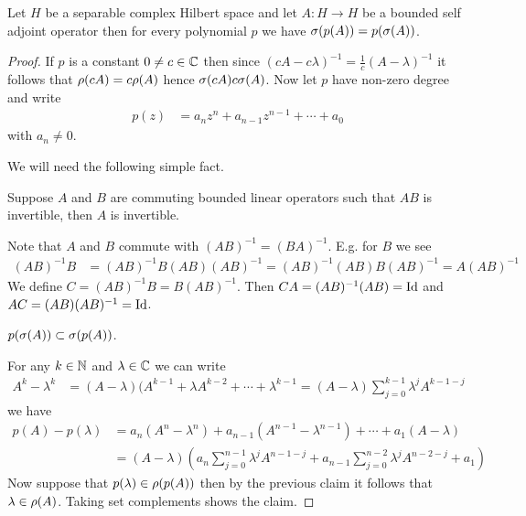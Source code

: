 \begin{lem}\label{hilbert:SpectralMappingPolynomialBoundedSelfAdjoint}Let $H$ be a separable complex Hilbert space and let $A :H \to H$ be a bounded self adjoint operator then for every polynomial $p$ we have $\sigma(p(A)) = p(\sigma(A))$.
\end{lem}
\begin{proof}
If $p$ is a constant $0 \neq c \in \mathbb{C}$ then since $(c A - c \lambda)^{-1}  = \frac{1}{c} (A - \lambda)^{-1}$ it follows that $\rho(cA) = c \rho(A)$ hence $\sigma(cA) c\sigma(A)$.  Now let $p$ have non-zero degree and write 
\begin{align*}
p(z) &= a_n z^n + a_{n-1} z^{n-1} + \dotsb + a_0
\end{align*}
with $a_n \neq 0$.  

We will need the following simple fact.
\begin{clm}Suppose $A$ and $B$ are commuting bounded linear operators such that $AB$ is invertible, then $A$ is invertible.
\end{clm}
Note that $A$ and $B$ commute with $(AB)^{-1} = (BA)^{-1}$.  E.g. for $B$ we see
\begin{align*}
(AB)^{-1} B  &= (AB)^{-1} B (AB) (AB) ^{-1}  =  (AB)^{-1} (AB) B  (AB) ^{-1} = A  (AB) ^{-1}
\end{align*}
We define $C = (AB)^{-1}B = B(AB)^{-1}$.  Then $C A = (AB)^{-1} (AB) = \operatorname*{Id}$ and $A C = (A B) (AB)^{-1} = \operatorname*{Id}$.

\begin{clm} $p(\sigma(A)) \subset \sigma(p(A))$.
\end{clm}
For any $k \in \mathbb{N}$ and $\lambda \in \mathbb{C}$ we can write
\begin{align*}
A^k - \lambda^k &= (A - \lambda) (A^{k-1} + \lambda A^{k-2} + \dotsb + \lambda^{k-1} = (A - \lambda) \sum_{j=0}^{k-1} \lambda^{j} A^{k-1-j}
\end{align*}
we have
\begin{align*}
p(A) - p(\lambda) &=  a_n (A^n - \lambda^n) + a_{n-1} (A^{n-1} - \lambda^{n-1})  + \dotsb + a_1 (A - \lambda) \\
&= (A - \lambda) \left ( a_n \sum_{j=0}^{n-1} \lambda^{j} A^{n-1-j} + a_{n-1} \sum_{j=0}^{n-2} \lambda^{j} A^{n-2-j} + a_1 \right )
\end{align*}
Now suppose that $p(\lambda) \in \rho(p(A))$ then by the previous claim it follows that $\lambda \in \rho(A)$.  Taking set complements shows the claim.


\end{proof}
